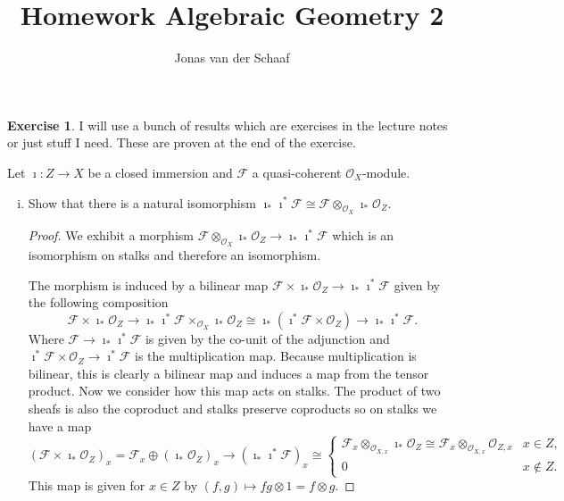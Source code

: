 \documentclass{article}
\title{Homework Algebraic Geometry 2}
\author{Jonas van der Schaaf}
\date{}
\newcommand{\sheaf}{\mathcal{O}}
\newcommand{\FF}{\mathcal{F}}
\newcommand{\incl}{\imath}
\theoremstyle{definition}
\newtheorem{question}{Exercise}
\begin{document}
\maketitle

\begin{question}
    I will use a bunch of results which are exercises in the lecture notes or
    just stuff I need. These are proven at the end of the exercise.

    Let \(\incl:Z\to X\) be a closed immersion and \(\FF\) a quasi-coherent
    \(\sheaf_{X}\)-module.
    \begin{enumerate}[(i)]
        \item Show that there is a natural isomorphism
              \(\incl_{*}\incl^{*}\FF\cong\FF\otimes_{\sheaf_{X}}\incl_{*}\sheaf_{Z}\).

              \begin{proof}
                  We exhibit a morphism
                  \(\FF\otimes_{\sheaf_{X}}\incl_{*}\sheaf_{Z}\to\incl_{*}\incl^{*}\FF\)
                  which is an isomorphism on stalks and therefore an
                  isomorphism.

                  The morphism is induced by a bilinear map
                  \(\FF\times\incl_{*}\sheaf_{Z}\to\incl_{*}\incl^{*}\FF\)
                  given by the following composition
                  \[
                      \FF\times\incl_{*}\sheaf_{Z}\to\incl_{*}\incl^{*}\FF\times_{\sheaf_{X}}\incl_{*}\sheaf_{Z}\cong\incl_{*}(\incl^{*}\FF\times\sheaf_{Z})\to\incl_{*}\incl^{*}\FF.
                  \]
                  Where \(\FF\to\incl_{*}\incl^{*}\FF\) is given by the co-unit
                  of the adjunction and
                  \(\incl^{*}\FF\times\sheaf_{Z}\to\incl^{*}\FF\) is the
                  multiplication map. Because multiplication is bilinear, this
                  is clearly a bilinear map and induces a map from the tensor
                  product. Now we consider how this map acts on stalks. The
                  product of two sheafs is also the coproduct and stalks
                  preserve coproducts so on stalks we have a map
                  \[
                      (\FF\times\incl_{*}\sheaf_{Z})_{x}=\FF_{x}\oplus(\incl_{*}\sheaf_{Z})_{x}\to(\incl_{*}\incl^{*}\FF)_{x}\cong\begin{cases}
                          \FF_{x}\otimes_{\sheaf_{X,x}}\incl_{*}\sheaf_{Z}\cong\FF_{x}\otimes_{\sheaf_{X,x}}\sheaf_{Z,x} & x\in Z,    \\
                          0                                                                                              & x\notin Z.
                      \end{cases}
                  \]
                  This map is given for \(x\in Z\) by \((f,g)\mapsto fg\otimes
                  1=f\otimes g\).


\end{proof}
\end{enumerate}
\end{question}
\end{document}
